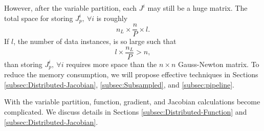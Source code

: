 \documentclass[12pt]{article}
\begin{document}
\par However, after the variable partition, each $J^i$ may still be a huge matrix. The total space for storing $J^i_p,\ \forall i$ is roughly
\begin{equation*}
n_L \times \frac{n}{P} \times l.
\end{equation*}
If $l$, the number of data instances, is so large such that 
\begin{equation*}
l \times \frac{n_L}{P} > n,
\end{equation*}
than storing $J^i_p,\ \forall i$ requires more space than the $n \times n$ Gauss-Newton matrix. 
To reduce the memory consumption, we will propose effective techniques in Sections \ref{subsec:Distributed-Jacobian}, \ref{subsec:Subsampled}, and \ref{subsec:pipeline}. 

\par With the variable partition, function, gradient, and Jacobian calculations become complicated. 
We discuss details in Sections \ref{subsec:Distributed-Function} and \ref{subsec:Distributed-Jacobian}.
\end{document}
